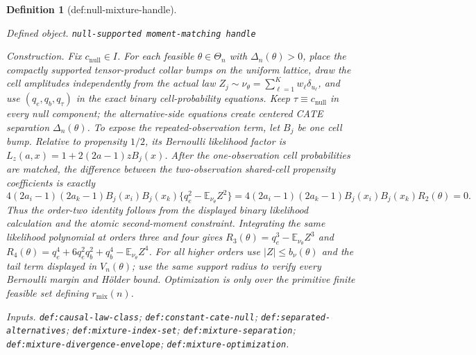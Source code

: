 \documentclass{article}
\newtheorem{definition}{Definition}
\begin{document}
\begin{definition}[def:null-mixture-handle]\label{def:null-mixture-handle}
\par\smallskip\noindent\emph{Defined object.} \texttt{null-\allowbreak{}supported moment-\allowbreak{}matching handle}
\par\smallskip\noindent\emph{Construction.} Fix \(c_{\mathrm{null}}\in I\). For each feasible \(\theta\in\Theta_n\) with \(\Delta_n(\theta)>0\), place the compactly supported tensor-product collar bumps on the uniform lattice, draw the cell amplitudes independently from the actual law \(Z_j\sim\nu_\theta=\sum_{\ell=1}^K w_\ell\delta_{u_\ell}\), and use \((q_e,q_b,q_\tau)\) in the exact binary cell-probability equations. Keep \(\tau\equiv c_{\mathrm{null}}\) in every null component; the alternative-side equations create centered CATE separation \(\Delta_n(\theta)\). To expose the repeated-observation term, let \(B_j\) be one cell bump. Relative to propensity \(1/2\), its Bernoulli likelihood factor is \(L_z(a,x)=1+2(2a-1)zB_j(x)\). After the one-observation cell probabilities are matched, the difference between the two-observation shared-cell propensity coefficients is exactly \[4(2a_i-1)(2a_k-1)B_j(x_i)B_j(x_k)\{q_e^2-\mathbb E_{\nu_\theta}Z^2\}=4(2a_i-1)(2a_k-1)B_j(x_i)B_j(x_k)R_2(\theta)=0.\] Thus the order-two identity follows from the displayed binary likelihood calculation and the atomic second-moment constraint. Integrating the same likelihood polynomial at orders three and four gives \(R_3(\theta)=q_e^3-\mathbb E_{\nu_\theta}Z^3\) and \(R_4(\theta)=q_e^4+6q_e^2q_b^2+q_b^4-\mathbb E_{\nu_\theta}Z^4\). For all higher orders use \(|Z|\le b_\nu(\theta)\) and the tail term displayed in \(V_n(\theta)\); use the same support radius to verify every Bernoulli margin and Hölder bound. Optimization is only over the primitive finite feasible set defining \(r_{\mathrm{mix}}(n)\).
\par\smallskip\noindent\emph{Inputs.} \texttt{def:\allowbreak{}causal-\allowbreak{}law-\allowbreak{}class}; \texttt{def:\allowbreak{}constant-\allowbreak{}cate-\allowbreak{}null}; \texttt{def:\allowbreak{}separated-\allowbreak{}alternatives}; \texttt{def:\allowbreak{}mixture-\allowbreak{}index-\allowbreak{}set}; \texttt{def:\allowbreak{}mixture-\allowbreak{}separation}; \texttt{def:\allowbreak{}mixture-\allowbreak{}divergence-\allowbreak{}envelope}; \texttt{def:\allowbreak{}mixture-\allowbreak{}optimization}.
\end{definition}
\end{document}
